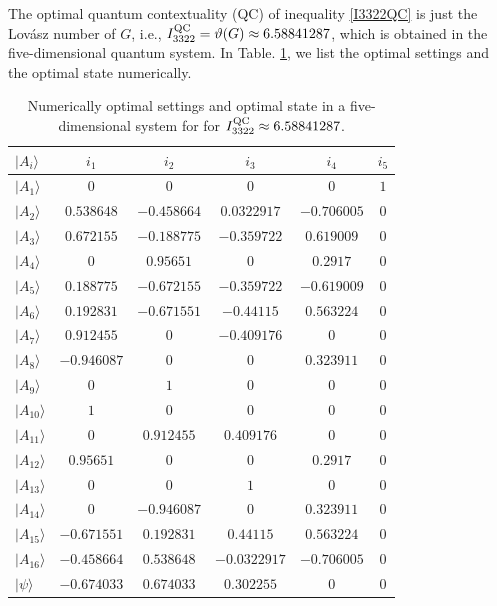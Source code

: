 \documentclass[pra,aps,notitlepage,superscriptaddress,showpacs,showkeys]{revtex4-1}
\theoremstyle{definition}
\theoremstyle{remark}
\begin{document}
The optimal quantum contextuality (QC) of inequality \eqref{I3322QC} is just the Lov\'asz number of $G$, i.e.,  $I_{3322}^{\rm QC}=\vartheta(G)\approx6.58841287$, which is obtained in the
five-dimensional quantum system. In Table. \ref{numerical}, we list
the optimal settings and the optimal state numerically.
\begin{table}[t]
\centering
\caption{Numerically optimal settings and optimal state in a five-dimensional system for for $I_{3322}^{\rm QC}\approx6.58841287$.}
  \begin{tabular}{lccccc} \hline \hline
$|A_i\rangle$ & $i_1$ & $i_2$ & $i_3$ & $i_4$ & $i_5$ \\
\hline
$|A_1\rangle$  & $0$ & $0$ & $0$ & $0$ & $1$ \\
$|A_2\rangle$  & $0.538648$ & $-0.458664$ & $0.0322917$ & $-0.706005$ & $0$ \\
$|A_3\rangle$  & $0.672155$ & $-0.188775$ & $-0.359722$ & $0.619009$ & $0$ \\
$|A_4\rangle$  & $0$ & $0.95651$ & $0$ & $0.2917$ & $0$ \\
$|A_5\rangle$  & $0.188775$ & $-0.672155$ & $-0.359722$ & $-0.619009$ & $0$ \\
$|A_6\rangle$  & $0.192831$ & $-0.671551$ & $-0.44115$ & $0.563224$ & $0$ \\
$|A_7\rangle$  & $0.912455$ & $0$ & $-0.409176$ & $0$ & $0$ \\
$|A_8\rangle$  & $-0.946087$ & $0$ & $0$ & $0.323911$ & $0$ \\
$|A_9\rangle$  & $0$ & $1$ & $0$ & $0$ & $0$ \\
$|A_{10}\rangle$ & $1$ & $0$ & $0$ & $0$ & $0$ \\
$|A_{11}\rangle$ & $0$ & $0.912455$ & $0.409176$ & $0$ & $0$ \\
$|A_{12}\rangle$ & $0.95651$ & $0$ & $0$ & $0.2917$ & $0$ \\
$|A_{13}\rangle$ & $0$ & $0$ & $1$ & $0$ & $0$ \\
$|A_{14}\rangle$ & $0$ & $-0.946087$ & $0$ & $0.323911$ & $0$ \\
$|A_{15}\rangle$ & $-0.671551$ & $0.192831$ & $0.44115$ & $0.563224$ & $0$ \\
$|A_{16}\rangle$ & $-0.458664$ & $0.538648$ & $-0.0322917$ & $-0.706005$ & $0$ \\
\hline
$|\psi\rangle$ & $-0.674033$ & $0.674033$ & $0.302255$ & $0$ & $0$\\
  \hline \hline
   \end{tabular}
\label{numerical}
\end{table}
\end{document}
